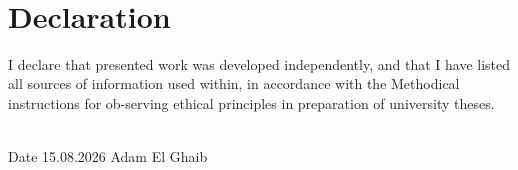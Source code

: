 ~\vfill{}

\section*{Declaration}

I declare that presented work was developed independently, and that I have listed all sources of information used within, in accordance with the Methodical instructions for ob-serving ethical principles in preparation of university theses.

\vspace{1.5cm}
~\\

Date 15.08.2026 \hfill{} Adam El Ghaib

\hfill{}~~~~~~~~~~~~~~~

\newpage{}
